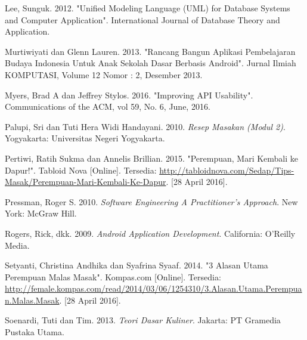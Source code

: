 \documentclass{jtetiskripsi}
\begin{document}
\begin{thebibliography}{99}
	 Lee, Sunguk. 2012. "Unified Modeling Language (UML) for Database Systems and Computer Application". International Journal of Database Theory and Application.
	
	 Murtiwiyati dan Glenn Lauren. 2013. "Rancang Bangun Aplikasi Pembelajaran Budaya Indonesia Untuk Anak Sekolah Dasar Berbasis Android". Jurnal Ilmiah KOMPUTASI, Volume 12 Nomor : 2, Desember 2013.	

	 Myers, Brad A dan Jeffrey Stylos. 2016. "Improving API Usability". Communications of the ACM, vol 59, No. 6, June, 2016.		
	
	Palupi, Sri dan Tuti Hera Widi Handayani. 2010. \textit{Resep Masakan (Modul 2)}. Yogyakarta: Universitas Negeri Yogyakarta.	
	
	 Pertiwi, Ratih Sukma dan Annelis Brillian.  2015. "Perempuan, Mari Kembali ke Dapur!".  Tabloid Nova [Online]. Tersedia: \url{http://tabloidnova.com/Sedap/Tips-Masak/Perempuan-Mari-Kembali-Ke-Dapur}. [28 April 2016].	
	
	Pressman, Roger S. 2010. \textit{Software Engineering A Practitioner's Approach}. New York: McGraw Hill.	
		
	Rogers, Rick, dkk. 2009. \textit{Android Application Development}. California: O'Reilly Media.	
	
	 Setyanti, Christina Andhika dan Syafrina Syaaf.  2014. "3 Alasan Utama Perempuan Malas Masak".  Kompas.com [Online]. Tersedia: \url{http://female.kompas.com/read/2014/03/06/1254310/3.Alasan.Utama.Perempuan.Malas.Masak}. [28 April 2016].
	
	Soenardi, Tuti dan Tim. 2013. \textit{Teori Dasar Kuliner}. Jakarta: PT Gramedia Pustaka Utama.	
		
	
\end{thebibliography}
\appendix{} 


\end{document}
